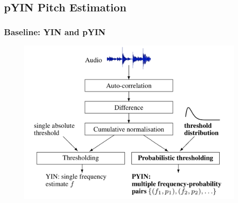 \documentclass{beamer}
\begin{document}
\subsection{pYIN Pitch Estimation}
\begin{frame}
\frametitle{Baseline: YIN and pYIN}
\begin{figure}
\includegraphics[width=0.8\linewidth]{Image/YIN_and_pYIN.png}
\end{figure}
\end{frame}


\end{document}
